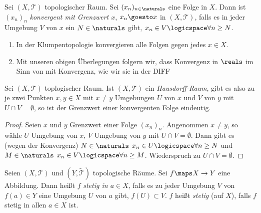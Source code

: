 \begin{definition} \label{konvergenz_in_topologischen_raeumen}
    Sei \( (X, \mathcal{T}) \) topologischer Raum.
    Sei \( (x_n)_{n\in \naturals} \) eine Folge in \( X \).
    Dann ist \( (x_n)_{n} \) \emph{konvergent mit Grenzwert \( x \)}, \( x_n\goesto x \) in \( (X, \mathcal{T}) \), falls es in jeder Umgebung \( V \) von \( x  \) ein \( N\in \naturals \) gibt, \sd \( x_n\in V\logicspace\forall n\geq N \).
    
\end{definition}

\begin{beispiele*}
    \begin{enumerate}
        \item In der Klumpentopologie konvergieren alle Folgen gegen jedes \( x\in X \).
        \item Mit unseren obigen Überlegungen folgern wir, dass Konvergenz in \( \reals \) im Sinn von  mit Konvergenz, wie wir sie in der DIFF 
    \end{enumerate}
\end{beispiele*}
\begin{lemma}\label{hausdorff_alle_grenzwerte_eindeutig}
    Sei \( (X,\mathcal{T}) \) toplogischer Raum. 
    Ist \( (X, \mathcal{T}) \) ein \emph{Hausdorff-Raum}, gibt es also zu je zwei Punkten \( x,y\in X \) mit \( x\neq y \) Umgebungen \( U \) von \( x \) und \( V \) von \( y \) mit \( U \cap V=\emptyset \), so ist der Grenzwert einer konvergenten Folge eindeutig.
\end{lemma}
\begin{proof}
    Seien \( x \) und \( y \) Grenzwert einer Folge \( (x_n)_n \).
    Angenommen \( x\neq y \), so wähle \( U \) Umgebung von \( x \), \( V \) Umgebung von \( y \) mit \( U\cap V=\emptyset \). 
    Dann gibt es (wegen der Konvergenz) \( N \in \naturals \) \sd \( x_n \in U \logicspace\forall n \geq N \) und \( M\in \naturals \) \sd \( x_n \in V \logicspace \forall n \geq M \). 
    Wiederspruch zu \( U\cap V = \emptyset \). 
\end{proof}
\begin{definition}\label{stetigkeit_in_topologischen_raeumen}
    Seien \( (X, \mathcal{T}) \) und \( (Y,\tilde{\mathcal{T}}) \) topologische Räume. 
    Sei \( f\maps X\to Y \) eine Abbildung. 
    Dann heißt \( f \) \emph{stetig in \( a\in X \)}, falls es zu jeder Umgebung \( V \) von \( f(a)\in Y \) eine Umgebung \( U \) von \( a \) gibt, \sd \( f(U)\subset V \). 
    \( f \) heißt \emph{stetig} (auf \( X \)), falls \( f \) stetig in allen \( a\in X \) ist.
\end{definition}
